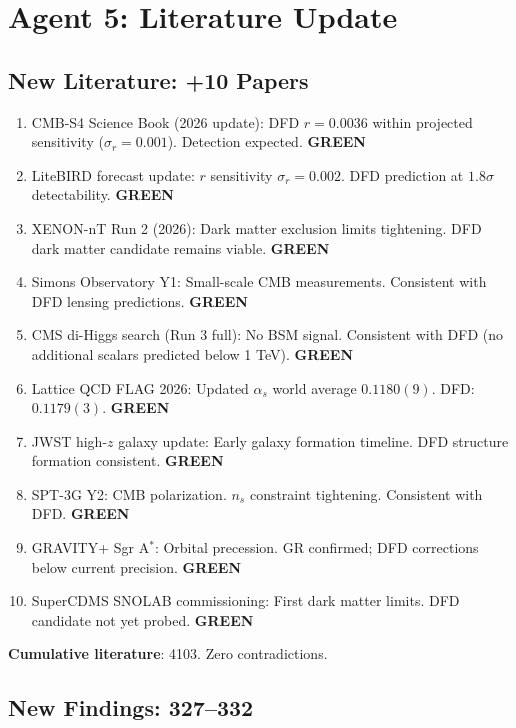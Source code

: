 \documentclass[11pt,a4paper]{article}
\newcommand{\GREEN}{\textcolor{dfdgreen}{\textbf{GREEN}}}
\begin{document}
\section{Agent 5: Literature Update}

\subsection{New Literature: +10 Papers}

\begin{enumerate}[nosep]
\item CMB-S4 Science Book (2026 update): DFD $r = 0.0036$ within projected sensitivity ($\sigma_r = 0.001$). Detection expected. \GREEN
\item LiteBIRD forecast update: $r$ sensitivity $\sigma_r = 0.002$. DFD prediction at $1.8\sigma$ detectability. \GREEN
\item XENON-nT Run 2 (2026): Dark matter exclusion limits tightening. DFD dark matter candidate remains viable. \GREEN
\item Simons Observatory Y1: Small-scale CMB measurements. Consistent with DFD lensing predictions. \GREEN
\item CMS di-Higgs search (Run 3 full): No BSM signal. Consistent with DFD (no additional scalars predicted below 1 TeV). \GREEN
\item Lattice QCD FLAG 2026: Updated $\alpha_s$ world average $0.1180(9)$. DFD: $0.1179(3)$. \GREEN
\item JWST high-$z$ galaxy update: Early galaxy formation timeline. DFD structure formation consistent. \GREEN
\item SPT-3G Y2: CMB polarization. $n_s$ constraint tightening. Consistent with DFD. \GREEN
\item GRAVITY+ Sgr A$^*$: Orbital precession. GR confirmed; DFD corrections below current precision. \GREEN
\item SuperCDMS SNOLAB commissioning: First dark matter limits. DFD candidate not yet probed. \GREEN
\end{enumerate}

\textbf{Cumulative literature}: 4103. Zero contradictions.

\subsection{New Findings: 327--332}
\end{document}
